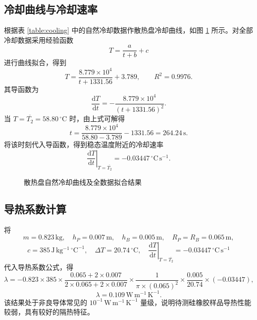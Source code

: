 \documentclass{../template/myrpt}
\begin{document}
\subsection{冷却曲线与冷却速率}
根据表 \ref{table:cooling} 中的自然冷却数据作散热盘冷却曲线，如图 \ref{fig:cooling-fit} 所示。对全部冷却数据采用经验函数
\[
  T = \frac{a}{t+b}+c
\]
进行曲线拟合，得到
\[
  T
  =
  \frac{8.779\times 10^4}{t+1331.56} + 3.789,
  \qquad
  R^2 = 0.9976.
\]
其导函数为
\[
  \frac{\mathrm{d}T}{\mathrm{d}t}
  =
  -\frac{8.779\times 10^4}{(t+1331.56)^2}.
\]
当 $T=\overline{T_2}=58.80\,^{\circ}\mathrm{C}$ 时，由上式可解得
\[
  t = \frac{8.779\times 10^4}{58.80-3.789} - 1331.56 = 264.24\,\mathrm{s}.
\]
将该时刻代入导函数，得到稳态温度附近的冷却速率
\[
  \left.\frac{\mathrm{d}T}{\mathrm{d}t}\right|_{T=\overline{T_2}}
  =
  -0.03447\,^{\circ}\mathrm{C}\,\mathrm{s}^{-1}.
\]

\begin{figure}[htbp]
  \centering
  \caption{散热盘自然冷却曲线及全数据拟合结果}
  \label{fig:cooling-fit}
\end{figure}

\subsection{导热系数计算}
将
\[
  m = 0.823\,\mathrm{kg},\quad
  h_P = 0.007\,\mathrm{m},\quad
  h_B = 0.005\,\mathrm{m},\quad
  R_P = R_B = 0.065\,\mathrm{m},
\]
\[
  c = 385\,\mathrm{J\,kg^{-1}\,^{\circ}C^{-1}},\quad
  \Delta T = 20.74\,^{\circ}\mathrm{C},\quad
  \left.\frac{\mathrm{d}T}{\mathrm{d}t}\right|_{T=\overline{T_2}}
  =
  -0.03447\,^{\circ}\mathrm{C}\,\mathrm{s}^{-1}
\]
代入导热系数公式，得
\[
  \lambda
  =
  -0.823 \times 385
  \times \frac{0.065 + 2\times 0.007}{2\times 0.065 + 2\times 0.007}
  \times \frac{1}{\pi \times (0.065)^2}
  \times \frac{0.005}{20.74}
  \times (-0.03447),
\]
\[
  \lambda = 0.109\,\mathrm{W\,m^{-1}\,K^{-1}}.
\]
该结果处于非良导体常见的 $10^{-1}\,\mathrm{W\,m^{-1}\,K^{-1}}$ 量级，说明待测硅橡胶样品导热性能较弱，具有较好的隔热特征。
\end{document}
